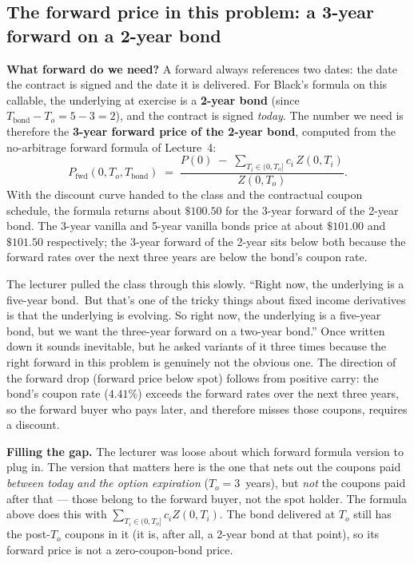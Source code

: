 \subsection{The forward price in this problem: a 3-year forward on a
2-year bond}\label{L6-sec:freddie-fwd}

\begin{keyblock}
\textbf{What forward do we need?}
A forward always references two dates: the date the contract is
signed and the date it is delivered. For Black's formula on this
callable, the underlying at exercise is a \textbf{2-year bond} (since
$T_{\text{bond}} - T_o = 5 - 3 = 2$), and the contract is signed
\emph{today}. The number we need is therefore the
\textbf{3-year forward price of the 2-year bond}, computed from the
no-arbitrage forward formula of Lecture~4:
\[
  P_{\text{fwd}}(0,T_o,T_{\text{bond}})
    \;=\; \frac{P(0)\;-\;\sum_{T_i \in (0, T_o]} c_i\, Z(0,T_i)}{Z(0,T_o)}.
\]
With the discount curve handed to the class and the contractual coupon
schedule, the formula returns about $\$100.50$ for the
3-year forward of the 2-year bond. The 3-year vanilla and 5-year
vanilla bonds price at about $\$101.00$ and $\$101.50$ respectively;
the 3-year forward of the 2-year sits below both because the forward
rates over the next three years are below the bond's coupon rate.
\end{keyblock}

The lecturer pulled the class through this slowly. ``Right now, the
underlying is a five-year bond.\ But that's one of the tricky things
about fixed income derivatives is that the underlying is evolving.
So right now, the underlying is a five-year bond, but we want the
three-year forward on a two-year bond.'' Once written down it sounds
inevitable, but he asked variants of it three times because the right
forward in this problem is genuinely not the obvious one. The
direction of the forward drop (forward price below spot) follows from
positive carry: the bond's coupon rate ($4.41\%$) exceeds the forward
rates over the next three years, so the forward buyer who pays
later, and therefore misses those coupons, requires a discount.

\begin{tipblock}
\textbf{Filling the gap.} The lecturer was loose about which forward
formula version to plug in. The version that matters here is the one
that nets out the coupons paid \emph{between today and the option
expiration} ($T_o = 3$~years), but \emph{not} the coupons paid after
that --- those belong to the forward buyer, not the spot holder. The
formula above does this with $\sum_{T_i \in (0, T_o]} c_i Z(0,T_i)$.
The bond delivered at $T_o$ still has the post-$T_o$ coupons in it
(it is, after all, a 2-year bond at that point), so its forward price
is not a zero-coupon-bond price.
\end{tipblock}

